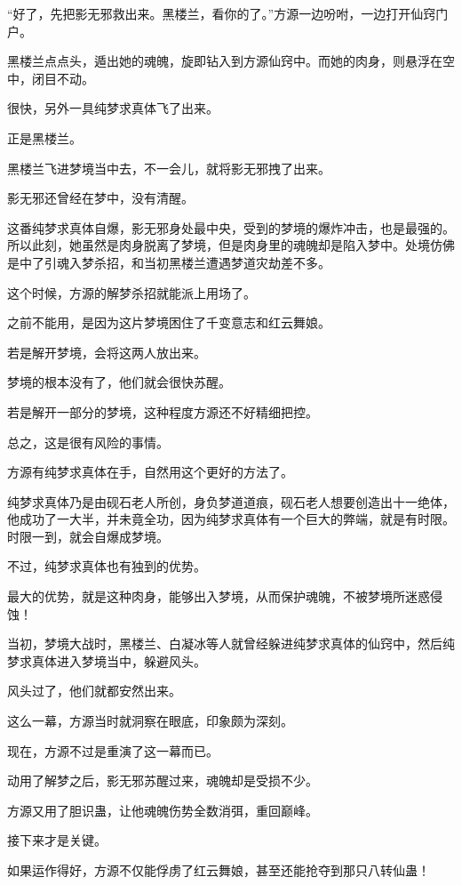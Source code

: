 
\begin{this_body}

“好了，先把影无邪救出来。黑楼兰，看你的了。”方源一边吩咐，一边打开仙窍门户。

黑楼兰点点头，遁出她的魂魄，旋即钻入到方源仙窍中。而她的肉身，则悬浮在空中，闭目不动。

很快，另外一具纯梦求真体飞了出来。

正是黑楼兰。

黑楼兰飞进梦境当中去，不一会儿，就将影无邪拽了出来。

影无邪还曾经在梦中，没有清醒。

这番纯梦求真体自爆，影无邪身处最中央，受到的梦境的爆炸冲击，也是最强的。所以此刻，她虽然是肉身脱离了梦境，但是肉身里的魂魄却是陷入梦中。处境仿佛是中了引魂入梦杀招，和当初黑楼兰遭遇梦道灾劫差不多。

这个时候，方源的解梦杀招就能派上用场了。

之前不能用，是因为这片梦境困住了千变意志和红云舞娘。

若是解开梦境，会将这两人放出来。

梦境的根本没有了，他们就会很快苏醒。

若是解开一部分的梦境，这种程度方源还不好精细把控。

总之，这是很有风险的事情。

方源有纯梦求真体在手，自然用这个更好的方法了。

纯梦求真体乃是由砚石老人所创，身负梦道道痕，砚石老人想要创造出十一绝体，他成功了一大半，并未竟全功，因为纯梦求真体有一个巨大的弊端，就是有时限。时限一到，就会自爆成梦境。

不过，纯梦求真体也有独到的优势。

最大的优势，就是这种肉身，能够出入梦境，从而保护魂魄，不被梦境所迷惑侵蚀！

当初，梦境大战时，黑楼兰、白凝冰等人就曾经躲进纯梦求真体的仙窍中，然后纯梦求真体进入梦境当中，躲避风头。

风头过了，他们就都安然出来。

这么一幕，方源当时就洞察在眼底，印象颇为深刻。

现在，方源不过是重演了这一幕而已。

动用了解梦之后，影无邪苏醒过来，魂魄却是受损不少。

方源又用了胆识蛊，让他魂魄伤势全数消弭，重回巅峰。

接下来才是关键。

如果运作得好，方源不仅能俘虏了红云舞娘，甚至还能抢夺到那只八转仙蛊！


\end{this_body}
